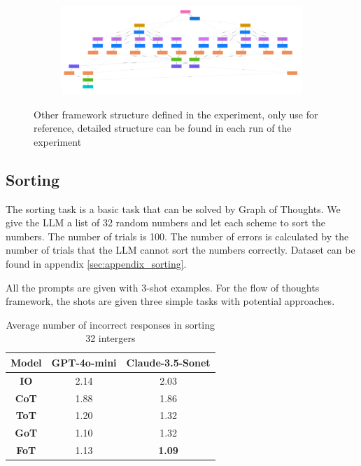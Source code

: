 \documentclass{article}
\begin{document}
\begin{figure}[h]
\begin{subfigure}{0.7\textwidth}
    \end{subfigure}
    \begin{subfigure}{1.0\textwidth}
        \centering
        \includegraphics[width=1.0\textwidth]{images/graph_of_thoughts.png}
    \end{subfigure}
    \caption{Other framework structure defined in the experiment, only use for reference, detailed structure can be found in each run of the experiment}
    \label{fig:sorting_results}
\end{figure}

\subsection{Sorting}

The sorting task is a basic task that can be solved by Graph of Thoughts. We give the LLM a list of 32 random numbers and let each scheme to sort the numbers. The number of trials is 100. The number of errors is calculated by the number of trials that the LLM cannot sort the numbers correctly. Dataset can be found in appendix \ref{sec:appendix_sorting}.

All the prompts are given with 3-shot examples. For the flow of thoughts framework, the shots are given three simple tasks with potential approaches.

\begin{table}[h]
    \centering
    \begin{tabular}{|c|c|c|}
        \hline
        \textbf{Model} & \textbf{GPT-4o-mini} & \textbf{Claude-3.5-Sonet} \\
        \hline \hline
        \textbf{IO}    & 2.14                 & 2.03                     \\
        \textbf{CoT}   & 1.88                 & 1.86                     \\
        \textbf{ToT}   & 1.20                 & 1.32                     \\
        \textbf{GoT}   & 1.10                 & 1.32                     \\
        \textbf{FoT}   & 1.13                 & \textbf{1.09}                     \\
        \hline
    \end{tabular}
    \vspace{1em}
    \caption{Average number of incorrect responses in sorting 32 intergers}
    \label{tab:sorting_results}
\end{table}
\end{document}

